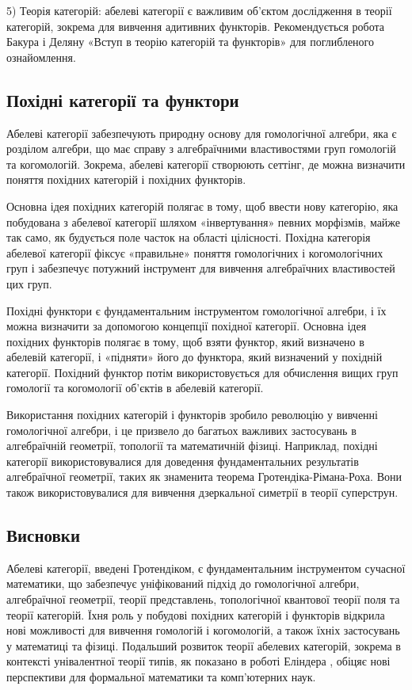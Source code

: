\documentclass{article}
\begin{document}
5) Теорія категорій: абелеві категорії є важливим об’єктом дослідження в теорії категорій, зокрема для вивчення адитивних функторів. Рекомендується робота Бакура і Деляну «Вступ в теорію категорій та функторів» \cite{BucurDelanu} для поглибленого ознайомлення.

\subsection{Похідні категорії та функтори}
Абелеві категорії забезпечують природну основу для гомологічної алгебри, яка є розділом алгебри, що має справу з алгебраїчними властивостями груп гомологій та когомологій. Зокрема, абелеві категорії створюють сеттінг, де можна визначити поняття похідних категорій і похідних функторів.

Основна ідея похідних категорій полягає в тому, щоб ввести нову категорію, яка побудована з абелевої категорії шляхом «інвертування» певних морфізмів, майже так само, як будується поле часток на області цілісності. Похідна категорія абелевої категорії фіксує «правильне» поняття гомологічних і когомологічних груп і забезпечує потужний інструмент для вивчення алгебраїчних властивостей цих груп.

Похідні функтори є фундаментальним інструментом гомологічної алгебри, і їх можна визначити за допомогою концепції похідної категорії. Основна ідея похідних функторів полягає в тому, щоб взяти функтор, який визначено в абелевій категорії, і «підняти» його до функтора, який визначений у похідній категорії. Похідний функтор потім використовується для обчислення вищих груп гомології та когомології об’єктів в абелевій категорії.

Використання похідних категорій і функторів зробило революцію у вивченні гомологічної алгебри, і це призвело до багатьох важливих застосувань в алгебраїчній геометрії, топології та математичній фізиці. Наприклад, похідні категорії використовувалися для доведення фундаментальних результатів алгебраїчної геометрії, таких як знаменита теорема Гротендіка-Рімана-Роха. Вони також використовувалися для вивчення дзеркальної симетрії в теорії суперструн.

\subsection{Висновки}
Абелеві категорії, введені Гротендіком, є фундаментальним інструментом сучасної математики, що забезпечує уніфікований підхід до гомологічної алгебри, алгебраїчної геометрії, теорії представлень, топологічної квантової теорії поля та теорії категорій. Їхня роль у побудові похідних категорій і функторів відкрила нові можливості для вивчення гомологій і когомологій, а також їхніх застосувань у математиці та фізиці. Подальший розвиток теорії абелевих категорій, зокрема в контексті унівалентної теорії типів, як показано в роботі Еліндера \cite{Elinder21}, обіцяє нові перспективи для формальної математики та комп’ютерних наук.
\end{document}
